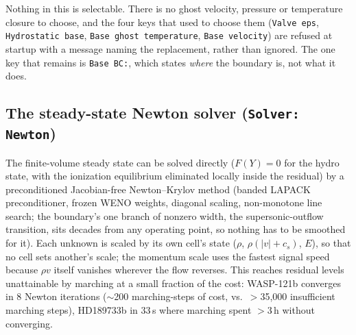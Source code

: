\documentclass[english,a4paper]{my_memo}
\begin{document}
Nothing in this is selectable. There is no ghost velocity, pressure or
temperature closure to choose, and the four keys that used to choose them
(\texttt{Valve eps}, \texttt{Hydrostatic base}, \texttt{Base ghost
temperature}, \texttt{Base velocity}) are refused at startup with a message
naming the replacement, rather than ignored. The one key that remains is
\texttt{Base BC:}, which states \emph{where} the boundary is, not what it does.

\subsection{The steady-state Newton solver (\texttt{Solver: Newton})}
\label{sec:newton}
The finite-volume steady state can be solved directly ($F(Y)=0$ for the hydro
state, with the ionization equilibrium eliminated locally inside the residual)
by a preconditioned Jacobian-free Newton--Krylov method (banded LAPACK
preconditioner, frozen WENO weights, diagonal scaling, non-monotone line search;
the boundary's one branch of nonzero width, the supersonic-outflow transition,
sits decades from any operating point, so nothing has to be smoothed for it). Each
unknown is scaled by its own cell's state ($\rho$, $\rho(|v|+c_s)$, $E$),
so that no cell sets another's scale; the momentum scale uses the fastest
signal speed because $\rho v$ itself vanishes wherever the flow reverses. This
reaches residual levels unattainable by marching at a small fraction of the cost:
WASP-121b converges in 8 Newton iterations ($\sim$200 marching-steps of cost,
vs.\ $>$35{,}000 insufficient marching steps), HD189733b in 33\,s where marching
spent $>$3\,h without converging.
\end{document}
